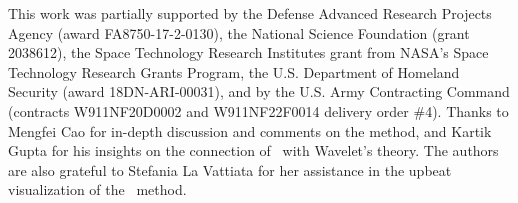 This work was partially supported by the Defense Advanced Research Projects Agency (award FA8750-17-2-0130), the National Science Foundation (grant 2038612), the Space Technology Research Institutes grant from NASA’s Space Technology Research Grants Program, the U.S. Department of Homeland Security (award 18DN-ARI-00031), and by the U.S. Army Contracting Command (contracts W911NF20D0002 and W911NF22F0014 delivery order \#4). Thanks to Mengfei Cao for in-depth discussion and comments on the method, and Kartik Gupta for his insights on the connection of \ours\ with Wavelet's theory. The authors are also grateful to Stefania La Vattiata for her assistance in the upbeat visualization of the \ourscomplete\ method.
